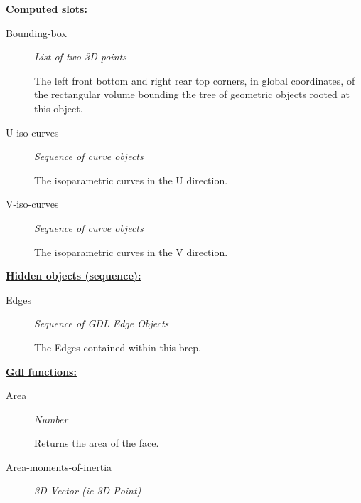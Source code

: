 \documentclass [11pt]{book}
\begin{document}
\begin{itemize}
\textbf{
\underline{Computed slots:}}

\begin{description}

\item [Bounding-box]
\emph{List of two 3D points}

 The left front bottom and right rear top corners, in global coordinates,
of the rectangular volume bounding the tree of geometric objects rooted at this object.




\item [U-iso-curves]
\emph{Sequence of curve objects}

 The isoparametric curves in the U direction.




\item [V-iso-curves]
\emph{Sequence of curve objects}

 The isoparametric curves in the V direction.




\end{description}






\textbf{
\underline{Hidden objects (sequence):}}

\begin{description}

\item [Edges]
\emph{Sequence of GDL Edge Objects}

 The Edges contained within this brep.




\end{description}






\textbf{
\underline{Gdl functions:}}

\begin{description}

\item [Area]
\emph{Number}

 Returns the area of the face.




\item [Area-moments-of-inertia]
\emph{3D Vector (ie 3D Point)}


\end{description}
\end{itemize}
\end{document}
